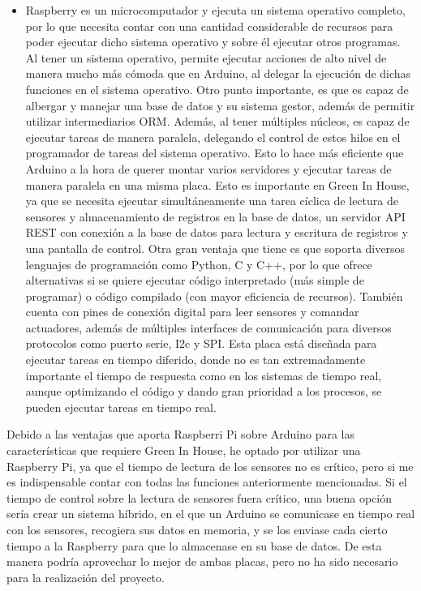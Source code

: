 \begin{itemize}
        \item Raspberry es un microcomputador y ejecuta un sistema operativo completo, por lo que necesita contar con una cantidad considerable de recursos para poder ejecutar dicho sistema operativo y sobre él ejecutar otros programas. Al tener un sistema operativo, permite ejecutar acciones de alto nivel de manera mucho más cómoda que en Arduino, al delegar la ejecución de dichas funciones en el sistema operativo. Otro punto importante, es que es capaz de albergar y manejar una base de datos y su sistema gestor, además de permitir utilizar intermediarios ORM. Además, al tener múltiples núcleos, es capaz de ejecutar tareas de manera paralela, delegando el control de estos hilos en el programador de tareas del sistema operativo. Esto lo hace más eficiente que Arduino a la hora de querer montar varios servidores y ejecutar tareas de manera paralela en una misma placa. Esto es importante en Green In House, ya que se necesita ejecutar simultáneamente una tarea cíclica de lectura de sensores y almacenamiento de registros en la base de datos, un servidor API REST con conexión a la base de datos para lectura y escritura de registros y una pantalla de control. Otra gran ventaja que tiene es que soporta diversos lenguajes de programación como Python, C y C++, por lo que ofrece alternativas si se quiere ejecutar código interpretado (más simple de programar) o código compilado (con mayor eficiencia de recursos). También cuenta con pines de conexión digital para leer sensores y comandar actuadores, además de múltiples interfaces de comunicación para diversos protocolos como puerto serie, I2c y SPI. Esta placa está diseñada para ejecutar tareas en tiempo diferido, donde no es tan extremadamente importante el tiempo de respuesta como en los sistemas de tiempo real, aunque optimizando el código y dando gran prioridad a los procesos, se pueden ejecutar tareas en tiempo real.
    \end{itemize}
    Debido a las ventajas que aporta Raspberri Pi sobre Arduino para las características que requiere Green In House, he optado por utilizar una Raspberry Pi, ya que el tiempo de lectura de los sensores no es crítico, pero si me es indispensable contar con todas las funciones anteriormente mencionadas. Si el tiempo de control sobre la lectura de sensores fuera crítico, una buena opción sería crear un sistema híbrido, en el que un Arduino se comunicase en tiempo real con los sensores, recogiera sus datos en memoria, y se los enviase cada cierto tiempo a la Raspberry para que lo almacenase en su base de datos. De esta manera podría aprovechar lo mejor de ambas placas, pero no ha sido necesario para la realización del proyecto.

